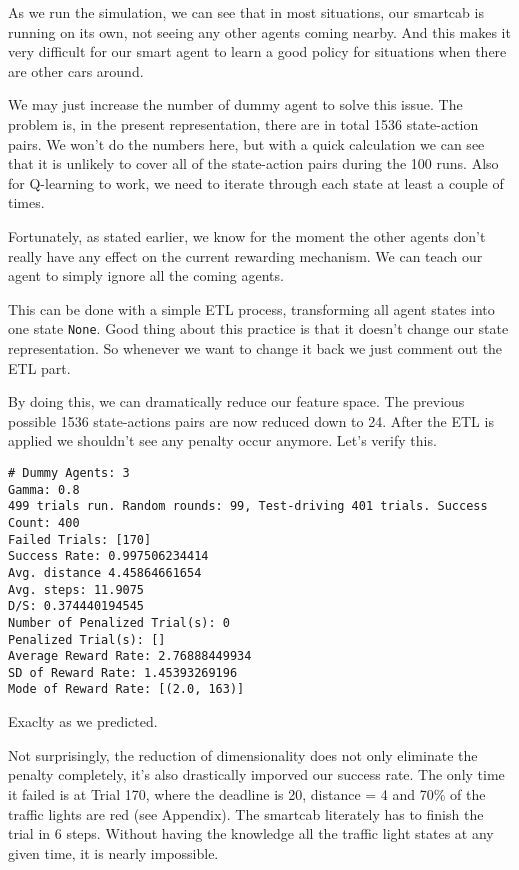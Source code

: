 \documentclass{article}
\begin{document}
As we run the simulation, we can see that in most situations, our
smartcab is running on its own, not seeing any other agents coming
nearby. And this makes it very difficult for our smart agent to learn a
good policy for situations when there are other cars around.

We may just increase the number of dummy agent to solve this issue. The
problem is, in the present representation, there are in total 1536
state-action pairs. We won't do the numbers here, but with a quick
calculation we can see that it is unlikely to cover all of the
state-action pairs during the 100 runs. Also for Q-learning to work, we
need to iterate through each state at least a couple of times.

Fortunately, as stated earlier, we know for the moment the other agents
don't really have any effect on the current rewarding mechanism. We can
teach our agent to simply ignore all the coming agents.

This can be done with a simple ETL process, transforming all agent
states into one state \texttt{\textquotesingle{}None\textquotesingle{}}.
Good thing about this practice is that it doesn't change our state
representation. So whenever we want to change it back we just comment
out the ETL part.

By doing this, we can dramatically reduce our feature space. The
previous possible 1536 state-actions pairs are now reduced down to 24.
After the ETL is applied we shouldn't see any penalty occur anymore.
Let's verify this.

\begin{verbatim}
# Dummy Agents: 3
Gamma: 0.8
499 trials run. Random rounds: 99, Test-driving 401 trials. Success Count: 400
Failed Trials: [170]
Success Rate: 0.997506234414
Avg. distance 4.45864661654
Avg. steps: 11.9075
D/S: 0.374440194545
Number of Penalized Trial(s): 0
Penalized Trial(s): []
Average Reward Rate: 2.76888449934
SD of Reward Rate: 1.45393269196
Mode of Reward Rate: [(2.0, 163)]
\end{verbatim}

Exaclty as we predicted.

Not surprisingly, the reduction of dimensionality does not only
eliminate the penalty completely, it's also drastically imporved our
success rate. The only time it failed is at Trial 170, where the
deadline is 20, distance = 4 and 70\% of the traffic lights are red (see
Appendix). The smartcab literately has to finish the trial in 6 steps.
Without having the knowledge all the traffic light states at any given
time, it is nearly impossible.
\end{document}
